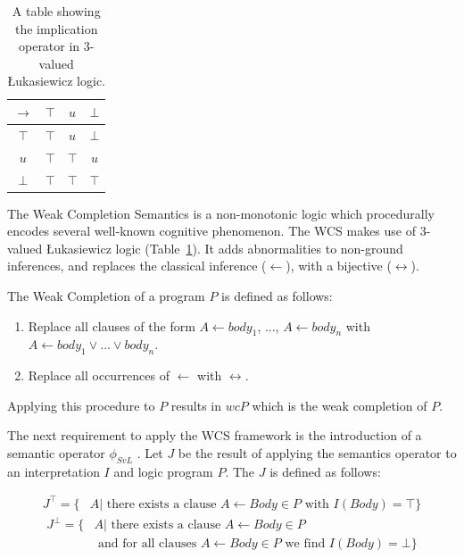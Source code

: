 \documentclass{article}
\begin{document}
\begin{table}
\begin{center}


\begin{tabular}{ c | c c c }
  $\rightarrow$& $\top$ & $u$ & $\bot$ \\ \hline
 $\top$ & $\top$ & $u$ & $\bot$ \\  
 $u$ & $\top$ & $\top$ & $u$\\  
 $\bot$ & $\top$ & $\top$ & $\top$
\end{tabular}
\caption{A table showing the implication operator in 3-valued \L ukasiewicz logic.}
\label{tbl:luk}

\end{center}
\end{table}

The Weak Completion Semantics is a non-monotonic logic which procedurally encodes several well-known cognitive phenomenon. The WCS makes use of 3-valued \L ukasiewicz logic (Table~\ref{tbl:luk}). It adds abnormalities to non-ground inferences, and replaces the classical inference ($\leftarrow$), with a bijective ($\leftrightarrow$). 

The Weak Completion of a program $P$ is defined as follows:

\begin{enumerate}
\item Replace all clauses of the form $A \leftarrow body_1$, ..., $A \leftarrow body_n$ with $A \leftarrow body_1 \lor ... \lor body_n$.
\item Replace all occurrences of $\leftarrow$ with $\leftrightarrow$.
\end{enumerate}

Applying this procedure to $P$ results in $wcP$ which is the weak completion of $P$.

The next requirement to apply the WCS framework is the introduction of a semantic operator $\phi_{SvL}$ \citep{stenning2008interpretation}. Let $J$ be the result of applying the semantics operator to an interpretation $I$ and logic program $P$. The $J$ is defined as follows:

\[
\begin{split}
J^\top = \{ & A | \textrm{ there exists a clause } A\leftarrow Body \in P \textrm{ with } I(Body) = \top\}
\end{split}
\]
\[
\begin{split}
J^\bot = \{ &  A | \textrm{ there exists a clause } A \leftarrow Body \in P \\
           & \textrm{ and for all clauses } A \leftarrow Body \in P \textrm{ we find } I(Body) = \bot\}
\end{split}
\]
\end{document}
